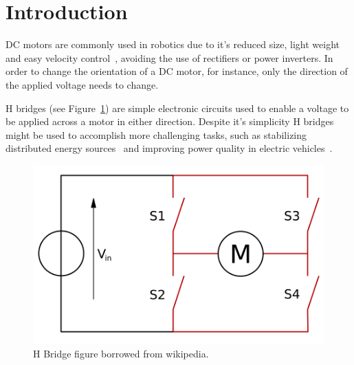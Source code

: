 \section{\textbf{Introduction}}\label{sec:1}
	DC motors are commonly used in robotics due to it's reduced size, light weight and easy velocity control~\cite{CHAPMAN}, avoiding the use of rectifiers or power inverters. In order to change the orientation of a DC motor, for instance, only the direction of the applied voltage needs to change.

	H bridges (see Figure~\ref{fig:bridge}) are simple electronic circuits used to enable a voltage to be applied across a motor in either direction. Despite it's simplicity H bridges might be used to accomplish more challenging tasks, such as stabilizing distributed energy sources~\cite{H-POWER-QUALITY} and improving power quality in electric vehicles~\cite{H-FILTERING}.

\begin{figure}[h]
\centering
	\centering%
	\includegraphics[height=.25\textwidth]{img/H_bridge.png}
	\caption[caption H Bridge]{H Bridge figure borrowed from wikipedia\protect\footnotemark.}
    \label{fig:bridge}%
\end{figure}
